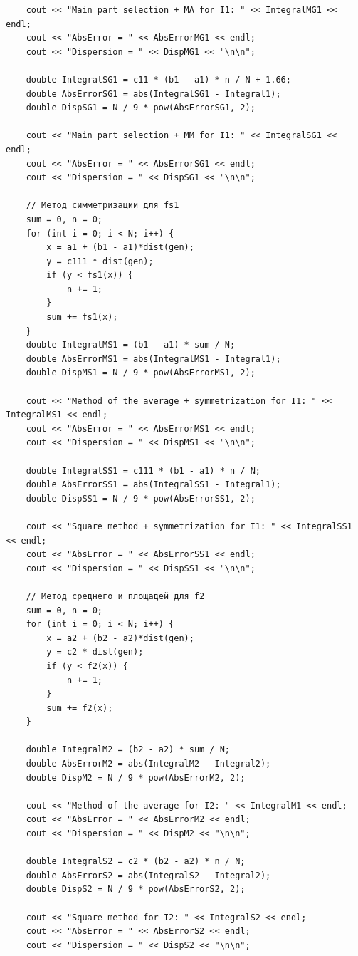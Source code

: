\documentclass[
11pt,
master, %
subf, %
href, %
colorlinks=true, %
times, %
]{disser}
\begin{document}
{\begin{verbatim}
    cout << "Main part selection + MA for I1: " << IntegralMG1 << endl;
    cout << "AbsError = " << AbsErrorMG1 << endl;
    cout << "Dispersion = " << DispMG1 << "\n\n";

    double IntegralSG1 = c11 * (b1 - a1) * n / N + 1.66;
    double AbsErrorSG1 = abs(IntegralSG1 - Integral1);
    double DispSG1 = N / 9 * pow(AbsErrorSG1, 2);

    cout << "Main part selection + MM for I1: " << IntegralSG1 << endl;
    cout << "AbsError = " << AbsErrorSG1 << endl;
    cout << "Dispersion = " << DispSG1 << "\n\n";

    // Метод симметризации для fs1
    sum = 0, n = 0;
    for (int i = 0; i < N; i++) {
        x = a1 + (b1 - a1)*dist(gen);
        y = c111 * dist(gen);
        if (y < fs1(x)) {
            n += 1;
        }
        sum += fs1(x);
    }
    double IntegralMS1 = (b1 - a1) * sum / N;
    double AbsErrorMS1 = abs(IntegralMS1 - Integral1);
    double DispMS1 = N / 9 * pow(AbsErrorMS1, 2);

    cout << "Method of the average + symmetrization for I1: " << IntegralMS1 << endl;
    cout << "AbsError = " << AbsErrorMS1 << endl;
    cout << "Dispersion = " << DispMS1 << "\n\n";

    double IntegralSS1 = c111 * (b1 - a1) * n / N;
    double AbsErrorSS1 = abs(IntegralSS1 - Integral1);
    double DispSS1 = N / 9 * pow(AbsErrorSS1, 2);

    cout << "Square method + symmetrization for I1: " << IntegralSS1 << endl;
    cout << "AbsError = " << AbsErrorSS1 << endl;
    cout << "Dispersion = " << DispSS1 << "\n\n";

    // Метод среднего и площадей для f2
    sum = 0, n = 0;
    for (int i = 0; i < N; i++) {
        x = a2 + (b2 - a2)*dist(gen);
        y = c2 * dist(gen);
        if (y < f2(x)) {
            n += 1;
        }
        sum += f2(x);
    }

    double IntegralM2 = (b2 - a2) * sum / N;
    double AbsErrorM2 = abs(IntegralM2 - Integral2);
    double DispM2 = N / 9 * pow(AbsErrorM2, 2);

    cout << "Method of the average for I2: " << IntegralM1 << endl;
    cout << "AbsError = " << AbsErrorM2 << endl;
    cout << "Dispersion = " << DispM2 << "\n\n";

    double IntegralS2 = c2 * (b2 - a2) * n / N;
    double AbsErrorS2 = abs(IntegralS2 - Integral2);
    double DispS2 = N / 9 * pow(AbsErrorS2, 2);

    cout << "Square method for I2: " << IntegralS2 << endl;
    cout << "AbsError = " << AbsErrorS2 << endl;
    cout << "Dispersion = " << DispS2 << "\n\n";


\end{verbatim}}
\end{document}
